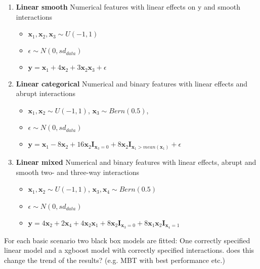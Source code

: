 \begin{enumerate}
    \item \textbf{Linear smooth}
        Numerical features with linear effects on y and smooth interactions
        \begin{itemize}
            \item $\textbf{x}_1,\textbf{x}_2, \textbf{x}_3 \sim U(-1,1)$
            \item $\epsilon \sim N(0, sd_{data})$
            \item $ \textbf{y} = \textbf{x}_1 + 4   \textbf{x}_2 + 3   \textbf{x}_2   \textbf{x}_3  + \epsilon$
           
        \end{itemize}
    \item \textbf{Linear categorical}
        Numerical and binary features with linear effects and abrupt interactions
        \begin{itemize}
            \item $\textbf{x}_1, \textbf{x}_2 \sim U(-1,1)$, $\textbf{x}_3 \sim Bern(0.5)$,  
            \item $\epsilon \sim N(0, sd_{data})$
            \item $ \textbf{y} =  \textbf{x}_{1} - 8  \textbf{x}_2 + 16  \textbf{x}_2  \mathbf{I}_{\textbf{x}_3 = 0} + 8  \textbf{x}_2  \mathbf{I}_{\textbf{x}_1 > mean(\textbf{x}_1)} + \epsilon $
            
        \end{itemize}
    \item \textbf{Linear mixed}
        Numerical and binary features with linear effects, abrupt and smooth two- and three-way interactions
        \begin{itemize}
            \item $\textbf{x}_1, \textbf{x}_2 \sim U(-1,1)$, $\textbf{x}_3, \textbf{x}_4 \sim Bern(0.5)$
            \item $\epsilon \sim N(0, sd_{data})$
            \item $\textbf{y} = 4   \textbf{x}_2 + 2   \textbf{x}_4  + 4   \textbf{x}_2   \textbf{x}_1 + 8   \textbf{x}_2   \mathbf{I}_{\textbf{x}_3 = 0} +  8 \textbf{x}_1   \textbf{x}_2    \mathbf{I}_{\textbf{x}_4 = 1}$
    
        \end{itemize}
\end{enumerate}

For each basic scenario two black box models are fitted: One correctly specified linear model and a xgboost model with correctly specified interactions. 
\color{blue}
does this change the trend of the results? (e.g. MBT with best performance etc.)


